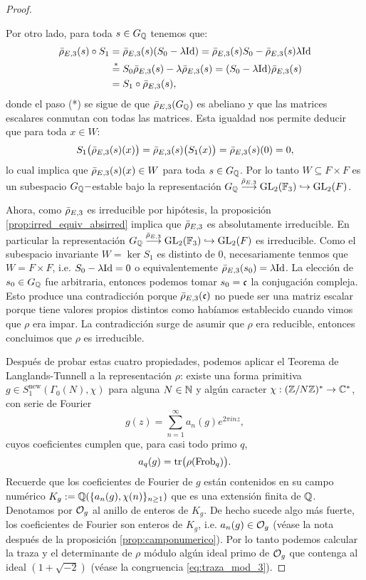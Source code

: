 \begin{proof}
\begin{enumerate}[label=\emph{\roman*})]
\-\;\; Por otro lado, para toda $s\in G_{\mathbb{Q}}$ tenemos que:
\begin{align*}
  \bar{\rho}_{E,3}(s)\circ S_1
  &=\bar{\rho}_{E,3}(s)(S_0-\lambda\mathrm{Id})=\bar{\rho}_{E,3}(s)S_0-\bar{\rho}_{E,3}(s)\lambda\mathrm{Id}\\
  &\overset{*}{=}S_0\bar{\rho}_{E,3}(s)-\lambda\bar{\rho}_{E,3}(s)=(S_0-\lambda\mathrm{Id})\bar{\rho}_{E,3}(s)\\
  &=S_1\circ\bar{\rho}_{E,3}(s),
\end{align*}
donde el paso (*) se sigue de que $\bar{\rho}_{E,3}(G_{\mathbb{Q}})$ es abeliano y que las matrices escalares conmutan con todas las matrices. Esta igualdad nos permite deducir que para toda $x\in W$:
\[
  S_1\big(\bar{\rho}_{E,3}(s)(x)\big)=\bar{\rho}_{E,3}(s)\big(S_1(x)\big)=\bar{\rho}_{E,3}(s)(0)=0,
\]
lo cual implica que $\bar{\rho}_{E,3}(s)(x)\in W$ para toda $s\in G_{\mathbb{Q}}$. Por lo tanto $W\subseteq F\times F$ es un subespacio $G_{\mathbb{Q}}-$estable bajo la representaci\'on $G_{\mathbb{Q}}\overset{\bar{\rho}_{E,3}}{\longrightarrow}\mathrm{GL}_2(\mathbb{F}_3)\hookrightarrow\mathrm{GL}_2(F)$.

\-\;\; Ahora, como $\bar{\rho}_{E,3}$ es irreducible por hip\'otesis, la proposici\'on \ref{prop:irred_equiv_absirred} implica que $\bar{\rho}_{E,3}$ es absolutamente irreducible. En particular la representaci\'on $G_{\mathbb{Q}}\overset{\bar{\rho}_{E,3}}{\longrightarrow}\mathrm{GL}_2(\mathbb{F}_3)\hookrightarrow\mathrm{GL}_2(F)$ es irreducible. Como el subespacio invariante $W=\ker S_1$ es distinto de 0, necesariamente tenmos que $W=F\times F$, i.e. $S_0-\lambda\mathrm{Id}=0$ o equivalentemente $\bar{\rho}_{E,3}(s_0)=\lambda\mathrm{Id}$. La elecci\'on de $s_0\in G_{\mathbb{Q}}$ fue arbitraria, entonces podemos tomar $s_0=\mathfrak{c}$ la conjugaci\'on compleja. Esto produce una contradicci\'on porque $\bar{\rho}_{E,3}(\mathfrak{c})$ no puede ser una matriz escalar porque tiene valores propios distintos como hab\'iamos establecido cuando vimos que $\rho$ era impar. La contradicci\'on surge de asumir que $\rho$ era reducible, entonces concluimos que $\rho$ es irreducible.
\end{enumerate}


Despu\'es de probar estas cuatro propiedades, podemos aplicar el Teorema de Langlands-Tunnell a la representaci\'on $\rho$: existe una forma primitiva $g\in S_1^{\mathrm{new}}(\Gamma_0(N),\chi)$ para alguna $N\in\mathbb{N}$ y alg\'un caracter $\chi:(\mathbb{Z}/N\mathbb{Z})^*\rightarrow\mathbb{C}^*$, con serie de Fourier
  \[
    g(z)=\sum_{n=1}^{\infty}a_n(g)e^{2\pi i nz},
  \]
cuyos coeficientes cumplen que, para casi todo primo $q$,
  \begin{equation}\label{eq:g_tr_fourier}
    a_q(g)=\mathrm{tr}\big(\rho(\mathrm{Frob}_q)\big).
  \end{equation}
  Recuerde que los coeficientes de Fourier de $g$ est\'an contenidos en su campo num\'erico $K_g:=\mathbb{Q}(\{a_n(g),\chi(n)\}_{n\geq1})$ que es una extensi\'on finita de $\mathbb{Q}$. Denotamos por $\mathcal{O}_g$ al anillo de enteros de $K_g$. De hecho sucede algo m\'as fuerte, los coeficientes de Fourier son enteros de $K_g$, i.e. $a_n(g)\in\mathcal{O}_g$ (v\'ease la nota despu\'es de la proposici\'on \ref{prop:camponumerico}). Por lo tanto podemos calcular la traza y el determinante de $\rho$ m\'odulo alg\'un ideal primo de $\mathcal{O}_g$ que contenga al ideal $(1+\sqrt{-2})$ (v\'ease la congruencia \eqref{eq:traza_mod_3}).
  

\end{proof}
